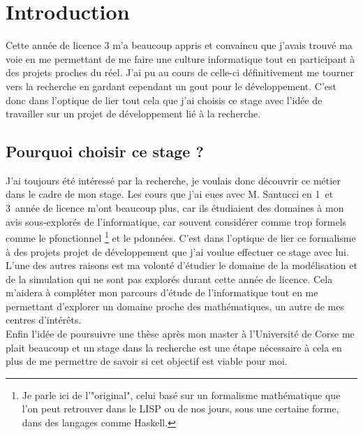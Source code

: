 \documentclass{rapport_stage}
\begin{document}



\chapter*{Introduction}  %

Cette année de licence 3 m'a beaucoup appris et convaincu que j'avais trouvé ma voie en me
permettant de me faire une culture informatique tout en participant à des projets proches du réel.
J'ai pu au cours de celle-ci définitivement me tourner vers la recherche en gardant cependant un
gout pour le développement. C'est donc dans l'optique de lier tout cela que j'ai choisis ce stage
avec l'idée de travailler sur un projet de développement lié à la recherche.

\section*{Pourquoi choisir ce stage ?}

J'ai toujours été intéressé par la recherche, je voulais donc découvrir ce
métier dans le cadre de mon stage. Les cours que j'ai eues avec M. Santucci en
1\iere \ et 3\ieme \ année de licence m'ont beaucoup plus, car ils étudiaient des domaines à mon
avis sous-explorés de l'informatique, car souvent considérer comme trop formels
comme le \gls{pfonctionnel}
\footnote{Je parle ici de l'"original", celui basé sur un formalisme mathématique que l'on peut
  retrouver dans le LISP ou de nos jours, sous une certaine forme, dans des langages comme Haskell.}
et le \gls{pdonnées}. C'est dans l'optique de lier ce formalisme à des projets projet de
développement que j'ai voulue effectuer ce stage avec lui.\\

L'une des autres raisons est ma volonté d'étudier le domaine de la modélisation et de la
simulation qui ne sont pas explorés durant cette année de licence. Cela
m'aidera à compléter mon parcours d'étude de l'informatique tout en me permettant
d'explorer un domaine proche des mathématiques, un autre de mes centres d'intérêts. \\

Enfin l'idée de poursuivre une thèse après mon master à l'Université de Corse
me plait beaucoup et un stage dans la recherche est une étape nécessaire à
cela en plus de me permettre de savoir si cet objectif est viable pour moi.
\end{document}
